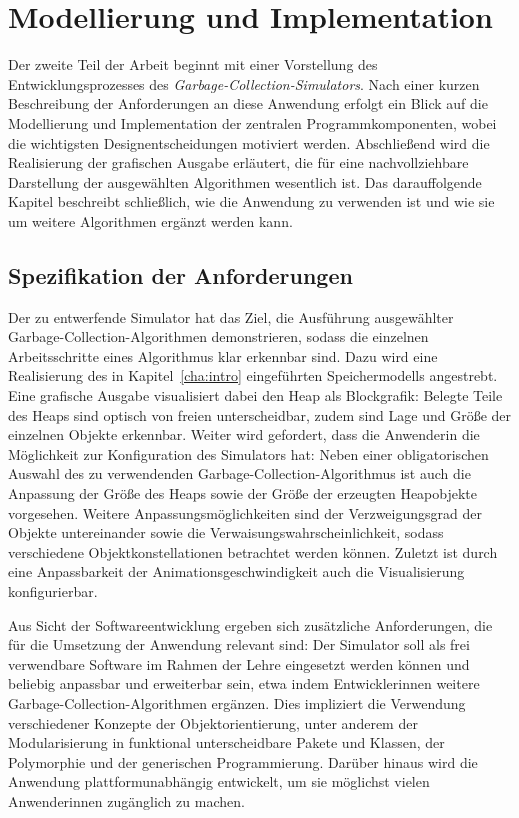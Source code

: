 \chapter{Modellierung und Implementation}
\label{cha:modelling}

Der zweite Teil der Arbeit beginnt mit einer Vorstellung des Entwicklungsprozesses des \textit{Garbage-Collection-Simulators}.
Nach einer kurzen Beschreibung der Anforderungen an diese Anwendung erfolgt ein Blick auf die Modellierung und Implementation der zentralen Programmkomponenten, wobei die wichtigsten Designentscheidungen motiviert werden.
Abschließend wird die Realisierung der grafischen Ausgabe erläutert, die für eine nachvollziehbare Darstellung der ausgewählten Algorithmen wesentlich ist.
Das darauffolgende Kapitel beschreibt schließlich, wie die Anwendung zu verwenden ist und wie sie um weitere Algorithmen ergänzt werden kann.

\section{Spezifikation der Anforderungen}
\label{sec:requirements}
Der zu entwerfende Simulator hat das Ziel, die Ausführung ausgewählter Garbage-Collection-Algorithmen demonstrieren, sodass die einzelnen Arbeitsschritte eines Algorithmus klar erkennbar sind.
Dazu wird eine Realisierung des in Kapitel~\ref{cha:intro} eingeführten Speichermodells angestrebt.
Eine grafische Ausgabe visualisiert dabei den Heap als Blockgrafik: Belegte Teile des Heaps sind optisch von freien unterscheidbar, zudem sind Lage und Größe der einzelnen Objekte erkennbar.
Weiter wird gefordert, dass die Anwenderin die Möglichkeit zur Konfiguration des Simulators hat:
Neben einer obligatorischen Auswahl des zu verwendenden Garbage-Collection-Algorithmus ist auch die Anpassung der Größe des Heaps sowie der Größe der erzeugten Heapobjekte vorgesehen.
Weitere Anpassungsmöglichkeiten sind der Verzweigungsgrad der Objekte untereinander sowie die Verwaisungswahrscheinlichkeit, sodass verschiedene Objektkonstellationen betrachtet werden können.
Zuletzt ist durch eine Anpassbarkeit der Animationsgeschwindigkeit auch die Visualisierung konfigurierbar.

Aus Sicht der Softwareentwicklung ergeben sich zusätzliche Anforderungen, die für die Umsetzung der Anwendung relevant sind:
Der Simulator soll als frei verwendbare Software im Rahmen der Lehre eingesetzt werden können und beliebig anpassbar und erweiterbar sein, etwa indem Entwicklerinnen weitere Garbage-Collection-Algorithmen ergänzen.
Dies impliziert die Verwendung verschiedener Konzepte der Objektorientierung, unter anderem der Modularisierung in funktional unterscheidbare Pakete und Klassen, der Polymorphie und der generischen Programmierung.
Darüber hinaus wird die Anwendung plattformunabhängig entwickelt, um sie möglichst vielen Anwenderinnen zugänglich zu machen.

